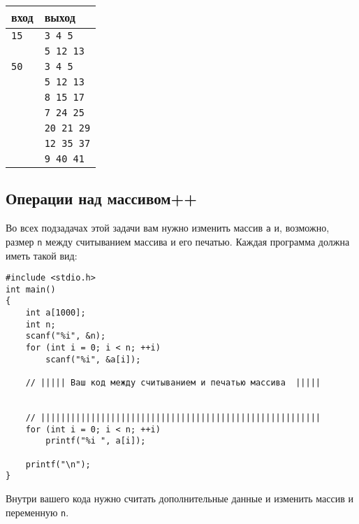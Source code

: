 \documentclass[10pt]{article}
\begin{document}
\begin{center}
\begin{tabular}{ l l }
 вход & выход \\ \hline
 \texttt{15}  & \texttt{3 4 5}  \\ 
              & \texttt{5 12 13}  \\ 
 \texttt{50}  & \texttt{3 4 5}  \\
              & \texttt{5 12 13}  \\ 
              & \texttt{8 15 17}  \\ 
              & \texttt{7 24 25}  \\ 
              & \texttt{20 21 29}  \\ 
              & \texttt{12 35 37}  \\ 
              & \texttt{9 40 41} 
\end{tabular}
\end{center}

\subsection{Операции над массивом++}
Во всех подзадачах этой задачи вам нужно изменить массив \texttt{a} и, возможно, размер \texttt{n} между считыванием массива и его печатью. Каждая программа должна иметь такой вид:
\begin{lstlisting}
#include <stdio.h>
int main() 
{
    int a[1000];
    int n;
    scanf("%i", &n);
    for (int i = 0; i < n; ++i)
        scanf("%i", &a[i]);

    // ||||| Ваш код между считыванием и печатью массива  |||||
    
    
    // ||||||||||||||||||||||||||||||||||||||||||||||||||||||||
    for (int i = 0; i < n; ++i)
        printf("%i ", a[i]);

    printf("\n");
}
\end{lstlisting}
Внутри вашего кода нужно считать дополнительные данные и изменить массив и переменную \texttt{n}.
\end{document}
